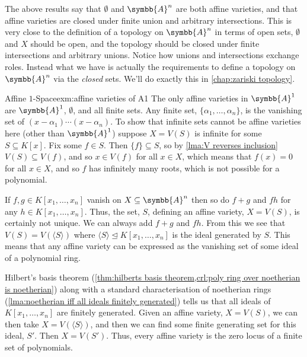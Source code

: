 \documentclass[fleqn]{NotesClass}
\newcommand{\subideal}{\trianglelefteq}
\newcommand{\affine}{\symbb{A}}
\begin{document}
    \begin{remark}{}{}
        The above results say that \(\emptyset\) and \(\affine^n\) are both affine varieties, and that affine varieties are closed under finite union and arbitrary intersections.
        This is very close to the definition of a topology on \(\affine^n\) in terms of open sets, \(\emptyset\) and \(X\) should be open, and the topology should be closed under finite intersections and arbitrary unions.
        Notice how unions and intersections exchange roles.
        Instead what we have is actually the requirements to define a topology on \(\affine^n\) via the \emph{closed} sets.
        We'll do exactly this in \cref{chap:zariski topology}.
    \end{remark}
    
    \begin{exm}{Affine {\normalsize \(1\)}-Space}{exm:affine varieties of A1}
        The only affine varieties in \(\affine^1\) are \(\affine^1\), \(\emptyset\), and all finite sets.
        Any finite set, \(\{\alpha_1, \dotsc, \alpha_n\}\), is the vanishing set of \((x - \alpha_1) \dotsm (x - \alpha_n)\).
        To show that infinite sets cannot be affine varieties here (other than \(\affine^1\)) suppose \(X = V(S)\) is infinite for some \(S \subseteq K[x]\).
        Fix some \(f \in S\).
        Then \(\{f\} \subseteq S\), so by \cref{lma:V reverses inclusion} \(V(S) \subseteq V(f)\), and so \(x \in V(f)\) for all \(x \in X\), which means that \(f(x) = 0\) for all \(x \in X\), and so \(f\) has infinitely many roots, which is not possible for a polynomial.
    \end{exm}
    
    If \(f, g \in K[x_1, \dotsc, x_n]\) vanish on \(X \subseteq \affine^n\) then so do \(f + g\) and \(f h\) for any \(h \in K[x_1, \dotsc, x_n]\).
    Thus, the set, \(S\), defining an affine variety, \(X = V(S)\), is certainly not unique.
    We can always add \(f + g\) and \(fh\).
    From this we see that \(V(S) = V(\langle S \rangle)\) where \(\langle S \rangle \subideal K[x_1, \dotsc, x_n]\) is the ideal generated by \(S\).
    This means that any affine variety can be expressed as the vanishing set of some ideal of a polynomial ring.
    
    Hilbert's basis theorem (\cref{thm:hilberts basis theorem,crl:poly ring over noetherian is noetherian}) along with a standard characterisation of noetherian rings (\cref{lma:noetherian iff all ideals finitely generated}) tells us that all ideals of \(K[x_1, \dotsc, x_n]\) are finitely generated.
    Given an affine variety, \(X = V(S)\), we can then take \(X = V(\langle S \rangle)\), and then we can find some finite generating set for this ideal, \(S'\).
    Then \(X = V(S')\).
    Thus, every affine variety is the zero locus of a finite set of polynomials.
    
\end{document}
